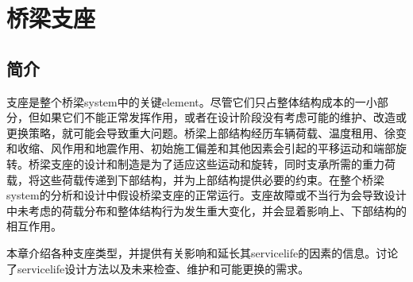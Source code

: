 \chapter{桥梁支座}
\label{chp:bridge-bearings}
\section{简介}
支座是整个桥梁\gls*{system}中的关键\gls*{element}。尽管它们只占整体结构成本的一小部分，但如果它们不能正常发挥作用，或者在设计阶段没有考虑可能的维护、改造或更换策略，就可能会导致重大问题。桥梁上部结构经历车辆荷载、温度租用、徐变和收缩、风作用和地震作用、初始施工偏差和其他因素会引起的平移运动和端部旋转。桥梁支座的设计和制造是为了适应这些运动和旋转，同时支承所需的重力荷载，将这些荷载传递到下部结构，并为上部结构提供必要的约束。在整个桥梁\gls*{system}的分析和设计中假设桥梁支座的正常运行。支座故障或不当行为会导致设计中未考虑的荷载分布和整体结构行为发生重大变化，并会显着影响上、下部结构的相互作用。

本章介绍各种支座类型，并提供有关影响和延长其\gls*{servicelife}的因素的信息。讨论了\gls*{servicelife}设计方法以及未来检查、维护和可能更换的需求。

